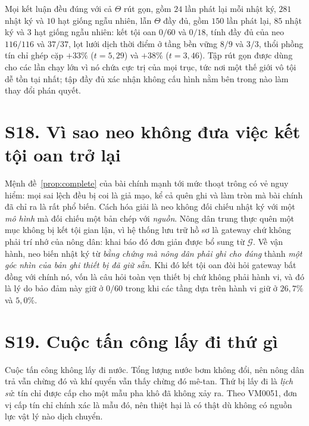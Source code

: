 Mọi kết luận đều đúng với cả $\Theta$ rút gọn, gồm $24$ lần phát lại mỗi nhật ký, $281$ nhật ký
và $10$ hạt giống ngẫu nhiên, lẫn $\Theta$ đầy đủ, gồm $150$ lần phát lại, $85$ nhật ký và $3$
hạt giống ngẫu nhiên: kết tội oan $0/60$ và $0/18$, tính đầy đủ của neo $116/116$ và $37/37$,
lọt lưới dịch thời điểm ở tầng bền vững $8/9$ và $3/3$, thổi phồng tín chỉ ghép cặp $+33\%$
($t=5{,}29$) và $+38\%$ ($t=3{,}46$). Tập rút gọn được dùng cho các lần chạy lớn vì nó chứa cực
trị của mọi trục, tức nơi một thế giới vô tội dễ tồn tại nhất; tập đầy đủ xác nhận không cấu
hình nằm bên trong nào làm thay đổi phán quyết.

\section*{S18. Vì sao neo không đưa việc kết tội oan trở lại}

Mệnh đề~\ref{prop:complete} của bài chính mạnh tới mức thoạt trông có vẻ nguy hiểm: mọi sai
lệch đều bị coi là giả mạo, kể cả quên ghi và làm tròn mà bài chính đã chỉ ra là rất phổ biến.
Cách hóa giải là neo không đối chiếu nhật ký với một \emph{mô hình} mà đối chiếu một bản chép
với \emph{nguồn}. Nông dân trung thực quên một mục không bị kết tội gian lận, vì hệ thống lưu
trữ hồ sơ là gateway chứ không phải trí nhớ của nông dân: khai báo đó đơn giản được bổ sung
từ $\mathcal{G}$. Về vận hành, neo biến nhật ký từ \emph{bằng chứng mà nông dân phải ghi cho
đúng} thành \emph{một góc nhìn của bản ghi thiết bị đã giữ sẵn}. Khi đó kết tội oan đòi hỏi
gateway bất đồng với chính nó, vốn là câu hỏi toàn vẹn thiết bị chứ không phải hành vi, và đó
là lý do bảo đảm này giữ ở $0/60$ trong khi các tầng dựa trên hành vi giữ ở $26{,}7\%$ và
$5{,}0\%$.

\section*{S19. Cuộc tấn công lấy đi thứ gì}

Cuộc tấn công không lấy đi nước. Tổng lượng nước bơm không đổi, nên nông dân trả vẫn chừng
đó và khí quyển vẫn thấy chừng đó mê-tan. Thứ bị lấy đi là \emph{lịch sử}: tín chỉ được cấp
cho một mẫu pha khô đã không xảy ra. Theo VM0051, đơn vị cấp tín chỉ chính xác là mẫu đó, nên
thiệt hại là có thật dù không có nguồn lực vật lý nào dịch chuyển.

